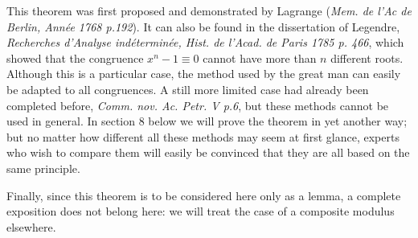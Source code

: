 \documentclass{book}
\theoremstyle{plain}
\theoremstyle{remark}
\begin{document}
This theorem was first proposed and demonstrated by Lagrange (\textit{Mem. de l'Ac de Berlin, Ann\'ee 1768 p.192}). It can also be found in the dissertation of Legendre, \textit{Recherches d'Analyse ind\'etermin\'ee, Hist. de l'Acad. de Paris 1785 p. 466}, which showed that the congruence $x^n-1\equiv0$ cannot have more than $n$ different roots. Although this is a particular case, the method used by the great man can easily be adapted to all congruences. A still more limited case had already been completed before, \textit{Comm. nov. Ac. Petr. V p.6}, but these methods cannot be used in general. In section 8 below we will prove the theorem in yet another way; but no matter how different all these methods may seem at first glance, experts who wish to compare them will easily be convinced that they are all based on the same principle.  

Finally, since this theorem is to be considered here only as a lemma, a complete exposition does not belong here: we will treat the case of a composite modulus elsewhere.
\end{document}

